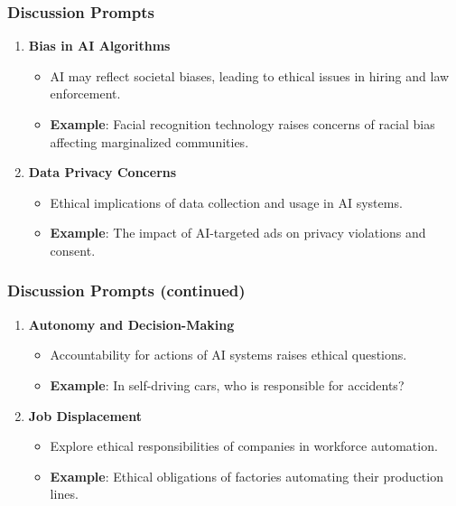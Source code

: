 \documentclass[aspectratio=169]{beamer}
\begin{document}
\begin{frame}[fragile]
    \frametitle{Discussion Prompts}
    \begin{enumerate}
        \item \textbf{Bias in AI Algorithms}
            \begin{itemize}
                \item AI may reflect societal biases, leading to ethical issues in hiring and law enforcement.
                \item \textbf{Example}: Facial recognition technology raises concerns of racial bias affecting marginalized communities.
            \end{itemize}
        \item \textbf{Data Privacy Concerns}
            \begin{itemize}
                \item Ethical implications of data collection and usage in AI systems.
                \item \textbf{Example}: The impact of AI-targeted ads on privacy violations and consent.
            \end{itemize}
    \end{enumerate}
\end{frame}

\begin{frame}[fragile]
    \frametitle{Discussion Prompts (continued)}
    \begin{enumerate}[resume]
        \item \textbf{Autonomy and Decision-Making}
            \begin{itemize}
                \item Accountability for actions of AI systems raises ethical questions.
                \item \textbf{Example}: In self-driving cars, who is responsible for accidents?
            \end{itemize}
        \item \textbf{Job Displacement}
            \begin{itemize}
                \item Explore ethical responsibilities of companies in workforce automation.
                \item \textbf{Example}: Ethical obligations of factories automating their production lines.
            \end{itemize}
    \end{enumerate}
\end{frame}
\end{document}
